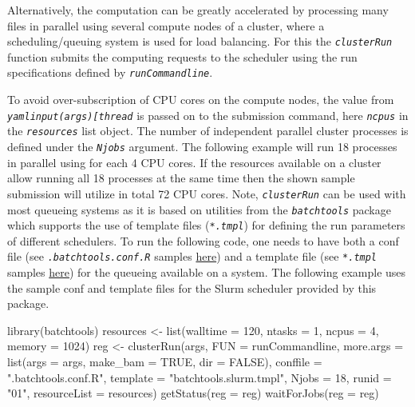 \documentclass[14pt,]{article}
\newcommand{\hlnum}[1]{\textcolor[rgb]{0.816,0.125,0.439}{#1}}%
\newcommand{\hlstr}[1]{\textcolor[rgb]{0.251,0.627,0.251}{#1}}%
\newcommand{\hlstd}[1]{\textcolor[rgb]{0.251,0.251,0.251}{#1}}%
\newcommand{\hlkwc}[1]{\textcolor[rgb]{0.251,0.251,0.251}{#1}}%
\newcommand{\hlkwd}[1]{\textcolor[rgb]{0.878,0.439,0.125}{#1}}%
\newenvironment{Shaded}{\begin{myshaded}}{\end{myshaded}}
\newcommand{\KeywordTok}[1]{\hlkwd{#1}}
\newcommand{\DataTypeTok}[1]{\hlkwc{#1}}
\newcommand{\DecValTok}[1]{\hlnum{#1}}
\newcommand{\StringTok}[1]{\hlstr{#1}}
\newcommand{\OtherTok}[1]{{#1}}
\newcommand{\NormalTok}[1]{\hlstd{#1}}
\begin{document}
Alternatively, the computation can be greatly accelerated by processing many files
in parallel using several compute nodes of a cluster, where a scheduling/queuing
system is used for load balancing. For this the \emph{\texttt{clusterRun}} function submits
the computing requests to the scheduler using the run specifications
defined by \emph{\texttt{runCommandline}}.

To avoid over-subscription of CPU cores on the compute nodes, the value from
\emph{\texttt{yamlinput(args){[}\textquotesingle{}thread\textquotesingle{}{]}}} is passed on to the submission command, here \emph{\texttt{ncpus}}
in the \emph{\texttt{resources}} list object. The number of independent parallel cluster
processes is defined under the \emph{\texttt{Njobs}} argument. The following example will run
18 processes in parallel using for each 4 CPU cores. If the resources available
on a cluster allow running all 18 processes at the same time then the shown sample
submission will utilize in total 72 CPU cores. Note, \emph{\texttt{clusterRun}} can be used
with most queueing systems as it is based on utilities from the \emph{\texttt{batchtools}}
package which supports the use of template files (\emph{\texttt{*.tmpl}}) for defining the
run parameters of different schedulers. To run the following code, one needs to
have both a conf file (see \emph{\texttt{.batchtools.conf.R}} samples \href{https://mllg.github.io/batchtools/}{here})
and a template file (see \emph{\texttt{*.tmpl}} samples \href{https://github.com/mllg/batchtools/tree/master/inst/templates}{here})
for the queueing available on a system. The following example uses the sample
conf and template files for the Slurm scheduler provided by this package.

\begin{Shaded}
\begin{Highlighting}[]
\KeywordTok{library}\NormalTok{(batchtools)}
\NormalTok{resources <-}\StringTok{ }\KeywordTok{list}\NormalTok{(}\DataTypeTok{walltime =} \DecValTok{120}\NormalTok{, }\DataTypeTok{ntasks =} \DecValTok{1}\NormalTok{, }\DataTypeTok{ncpus =} \DecValTok{4}\NormalTok{, }\DataTypeTok{memory =} \DecValTok{1024}\NormalTok{)}
\NormalTok{reg <-}\StringTok{ }\KeywordTok{clusterRun}\NormalTok{(args, }\DataTypeTok{FUN =}\NormalTok{ runCommandline, }\DataTypeTok{more.args =} \KeywordTok{list}\NormalTok{(}\DataTypeTok{args =}\NormalTok{ args, }\DataTypeTok{make_bam =} \OtherTok{TRUE}\NormalTok{, }
    \DataTypeTok{dir =} \OtherTok{FALSE}\NormalTok{), }\DataTypeTok{conffile =} \StringTok{".batchtools.conf.R"}\NormalTok{, }\DataTypeTok{template =} \StringTok{"batchtools.slurm.tmpl"}\NormalTok{, }
    \DataTypeTok{Njobs =} \DecValTok{18}\NormalTok{, }\DataTypeTok{runid =} \StringTok{"01"}\NormalTok{, }\DataTypeTok{resourceList =}\NormalTok{ resources)}
\KeywordTok{getStatus}\NormalTok{(}\DataTypeTok{reg =}\NormalTok{ reg)}
\KeywordTok{waitForJobs}\NormalTok{(}\DataTypeTok{reg =}\NormalTok{ reg)}
\end{Highlighting}
\end{Shaded}
\end{document}
